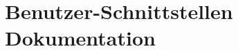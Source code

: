\documentclass[12pt,a4paper,twoside,openany]{report}
\begin{document}
\chapter{Benutzer-Schnittstellen Dokumentation \MjAnnotation{}}\label{sec:apdx:api_reference}
{






}
\end{document}
